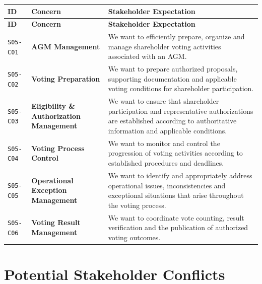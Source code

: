 \documentclass[11pt,a4paper]{article}
\begin{document}
\begingroup\small
\begin{longtable}{@{}>{\raggedright\arraybackslash}p{}>{\raggedright\arraybackslash}p{}>{\raggedright\arraybackslash}p{}@{}}
\toprule
\textbf{ID} & \textbf{Concern} & \textbf{Stakeholder Expectation} \\
\midrule
\endfirsthead
\toprule
\textbf{ID} & \textbf{Concern} & \textbf{Stakeholder Expectation} \\
\midrule
\endhead
\bottomrule
\endfoot
\texttt{S05-C01} & \textbf{AGM Management} & We want to efficiently prepare, organize and manage shareholder voting activities associated with an AGM. \\
\addlinespace
\texttt{S05-C02} & \textbf{Voting Preparation} & We want to prepare authorized proposals, supporting documentation and applicable voting conditions for shareholder participation. \\
\addlinespace
\texttt{S05-C03} & \textbf{Eligibility \& Authorization Management} & We want to ensure that shareholder participation and representative authorizations are established according to authoritative information and applicable conditions. \\
\addlinespace
\texttt{S05-C04} & \textbf{Voting Process Control} & We want to monitor and control the progression of voting activities according to established procedures and deadlines. \\
\addlinespace
\texttt{S05-C05} & \textbf{Operational Exception Management} & We want to identify and appropriately address operational issues, inconsistencies and exceptional situations that arise throughout the voting process. \\
\addlinespace
\texttt{S05-C06} & \textbf{Voting Result Management} & We want to coordinate vote counting, result verification and the publication of authorized voting outcomes. \\
\end{longtable}
\endgroup


\section*{Potential Stakeholder Conflicts}
\end{document}
